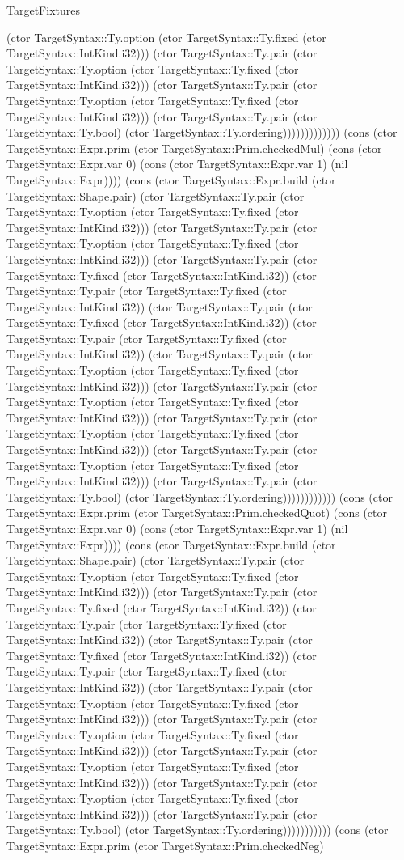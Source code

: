 \begin{lexlean}{TargetFixtures}
\begin{semanticmodule}
{(ctor TargetSyntax::Ty.option (ctor TargetSyntax::Ty.fixed (ctor TargetSyntax::IntKind.i32))) (ctor TargetSyntax::Ty.pair (ctor TargetSyntax::Ty.option (ctor TargetSyntax::Ty.fixed (ctor TargetSyntax::IntKind.i32))) (ctor TargetSyntax::Ty.pair (ctor TargetSyntax::Ty.option (ctor TargetSyntax::Ty.fixed (ctor TargetSyntax::IntKind.i32))) (ctor TargetSyntax::Ty.pair (ctor TargetSyntax::Ty.bool) (ctor TargetSyntax::Ty.ordering))))))))))))) (cons (ctor TargetSyntax::Expr.prim (ctor TargetSyntax::Prim.checkedMul) (cons (ctor TargetSyntax::Expr.var 0) (cons (ctor TargetSyntax::Expr.var 1) (nil TargetSyntax::Expr)))) (cons (ctor TargetSyntax::Expr.build (ctor TargetSyntax::Shape.pair) (ctor TargetSyntax::Ty.pair (ctor TargetSyntax::Ty.option (ctor TargetSyntax::Ty.fixed (ctor TargetSyntax::IntKind.i32))) (ctor TargetSyntax::Ty.pair (ctor TargetSyntax::Ty.option (ctor TargetSyntax::Ty.fixed (ctor TargetSyntax::IntKind.i32))) (ctor TargetSyntax::Ty.pair (ctor TargetSyntax::Ty.fixed (ctor TargetSyntax::IntKind.i32)) (ctor TargetSyntax::Ty.pair (ctor TargetSyntax::Ty.fixed (ctor TargetSyntax::IntKind.i32)) (ctor TargetSyntax::Ty.pair (ctor TargetSyntax::Ty.fixed (ctor TargetSyntax::IntKind.i32)) (ctor TargetSyntax::Ty.pair (ctor TargetSyntax::Ty.fixed (ctor TargetSyntax::IntKind.i32)) (ctor TargetSyntax::Ty.pair (ctor TargetSyntax::Ty.option (ctor TargetSyntax::Ty.fixed (ctor TargetSyntax::IntKind.i32))) (ctor TargetSyntax::Ty.pair (ctor TargetSyntax::Ty.option (ctor TargetSyntax::Ty.fixed (ctor TargetSyntax::IntKind.i32))) (ctor TargetSyntax::Ty.pair (ctor TargetSyntax::Ty.option (ctor TargetSyntax::Ty.fixed (ctor TargetSyntax::IntKind.i32))) (ctor TargetSyntax::Ty.pair (ctor TargetSyntax::Ty.option (ctor TargetSyntax::Ty.fixed (ctor TargetSyntax::IntKind.i32))) (ctor TargetSyntax::Ty.pair (ctor TargetSyntax::Ty.bool) (ctor TargetSyntax::Ty.ordering)))))))))))) (cons (ctor TargetSyntax::Expr.prim (ctor TargetSyntax::Prim.checkedQuot) (cons (ctor TargetSyntax::Expr.var 0) (cons (ctor TargetSyntax::Expr.var 1) (nil TargetSyntax::Expr)))) (cons (ctor TargetSyntax::Expr.build (ctor TargetSyntax::Shape.pair) (ctor TargetSyntax::Ty.pair (ctor TargetSyntax::Ty.option (ctor TargetSyntax::Ty.fixed (ctor TargetSyntax::IntKind.i32))) (ctor TargetSyntax::Ty.pair (ctor TargetSyntax::Ty.fixed (ctor TargetSyntax::IntKind.i32)) (ctor TargetSyntax::Ty.pair (ctor TargetSyntax::Ty.fixed (ctor TargetSyntax::IntKind.i32)) (ctor TargetSyntax::Ty.pair (ctor TargetSyntax::Ty.fixed (ctor TargetSyntax::IntKind.i32)) (ctor TargetSyntax::Ty.pair (ctor TargetSyntax::Ty.fixed (ctor TargetSyntax::IntKind.i32)) (ctor TargetSyntax::Ty.pair (ctor TargetSyntax::Ty.option (ctor TargetSyntax::Ty.fixed (ctor TargetSyntax::IntKind.i32))) (ctor TargetSyntax::Ty.pair (ctor TargetSyntax::Ty.option (ctor TargetSyntax::Ty.fixed (ctor TargetSyntax::IntKind.i32))) (ctor TargetSyntax::Ty.pair (ctor TargetSyntax::Ty.option (ctor TargetSyntax::Ty.fixed (ctor TargetSyntax::IntKind.i32))) (ctor TargetSyntax::Ty.pair (ctor TargetSyntax::Ty.option (ctor TargetSyntax::Ty.fixed (ctor TargetSyntax::IntKind.i32))) (ctor TargetSyntax::Ty.pair (ctor TargetSyntax::Ty.bool) (ctor TargetSyntax::Ty.ordering))))))))))) (cons (ctor TargetSyntax::Expr.prim (ctor TargetSyntax::Prim.checkedNeg) }
\end{semanticmodule}
\end{lexlean}
